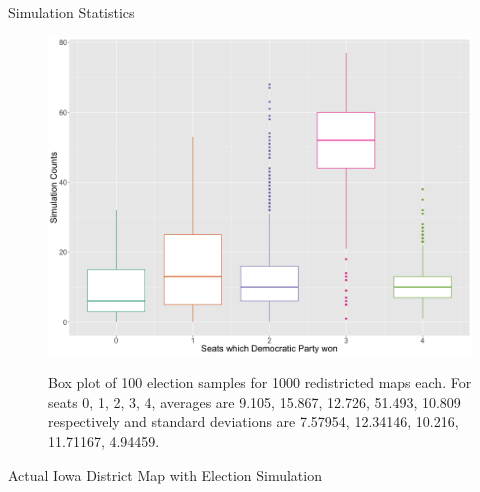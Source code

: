 \documentclass[leqno, handout]{beamer}
\theoremstyle{definition}
\begin{document}
\begin{frame}
\begin{columns}[t]

\begin{column}{.45\linewidth}

\begin{columns}[t]
\begin{column}{.48\linewidth}
\begin{block}{Simulation Statistics}
\vspace{1ex}
\begin{figure}
		\includegraphics[width=25cm]{boxplot.png}\\
		\caption{Box plot of 100 election samples for 1000 redistricted maps each. For seats 0, 1, 2, 3, 4, averages are 9.105, 15.867, 12.726, 51.493, 10.809 respectively and standard deviations are 7.57954, 12.34146, 10.216, 11.71167, 4.94459.}
		\end{figure}



\end{block}
\begin{block}{Actual Iowa District Map with Election Simulation}


\end{block}
\end{column}
\end{columns}
\end{column}
\end{columns}
\end{frame}
\end{document}
